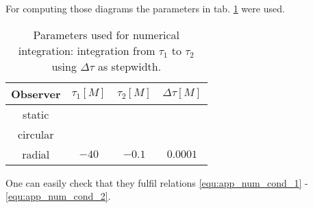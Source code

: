 For computing those diagrams the parameters in tab. \ref{tab:app_num_params} were used. 
\begin{table}
\centering
\caption{Parameters used for numerical integration: integration from \(\tau_1\) to \(\tau_2\) using \(\Delta\tau\) as stepwidth.}
\label{tab:app_num_params}
\begin{tabular}{cccc}
\toprule
Observer & \(\tau_1[M]\) & \(\tau_2[M]\) & \(\Delta\tau[M]\)\\
\midrule
static & \\
circular & \\
radial & \(-40\) & \(-0.1\) &  \(0.0001\)\\
\bottomrule
\end{tabular}
\end{table}

One can easily check that they fulfil relations \eqref{equ:app_num_cond_1} - \eqref{equ:app_num_cond_2}.